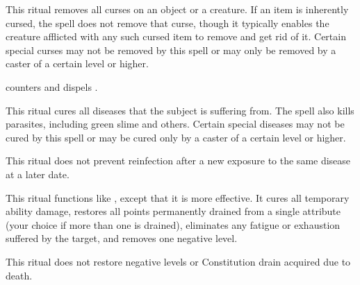 \begin{spelleffect}
This ritual removes all curses on an object or a creature. If an item is inherently cursed, the spell does not remove that curse, though it typically enables the creature afflicted with any such cursed item to remove and get rid of it. Certain special curses may not be removed by this spell or may only be removed by a caster of a certain level or higher.
\end{spelleffect}
\begin{spellnotes}
 counters and dispels .
\end{spellnotes}

\begin{spelleffect}
This ritual cures all diseases that the subject is suffering from. The spell also kills parasites, including green slime and others. Certain special diseases may not be cured by this spell or may be cured only by a caster of a certain level or higher.
\end{spelleffect}
\begin{spellnotes}
This ritual does not prevent reinfection after a new exposure to the same disease at a later date.
\end{spellnotes}

\begin{spelleffect}
This ritual functions like , except that it is more effective. It cures all temporary ability damage, restores all points permanently drained from a single attribute (your choice if more than one is drained), eliminates any fatigue or exhaustion suffered by the target, and removes one negative level.
\end{spelleffect}
\begin{spellnotes}
This ritual does not restore negative levels or Constitution drain acquired due to death.
\end{spellnotes}

